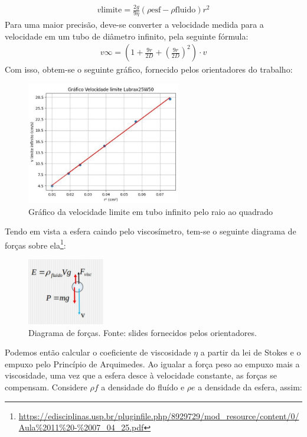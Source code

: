 \begin{align*}
    v\text{limite} =\frac{2g}{9\eta}(\rho \text{esf}- \rho \text{fluido})r^2
\end{align*}
Para uma maior precisão, deve-se converter a velocidade medida para a velocidade em um tubo de diâmetro infinito, pela seguinte fórmula:
\begin{align*}
    v \infty = \left(1 + \frac{9r}{2D} + \left(\frac{9r}{2D}\right)^2\right) \cdot v 
\end{align*}
Com isso, obtem-se o seguinte gráfico, fornecido pelos orientadores do trabalho:
\begin{figure}[H]
    \centering
    \includegraphics[width=0.6\textwidth]{fig/GraficoOrientadores.jpg}
    \caption{Gráfico da velocidade limite em tubo infinito pelo raio ao quadrado}
    \label{fig:grafVisc2}
\end{figure}
Tendo em vista a esfera caindo pelo viscosímetro, tem-se o seguinte diagrama de forças sobre ela\footnote{\url{https://edisciplinas.usp.br/pluginfile.php/8929729/mod_resource/content/0/Aula\%2011\%20-\%2007_04_25.pdf}}:
\begin{figure}[H]
    \centering
    \includegraphics[width=0.3\textwidth]{fig/DiagramaDeForcas.png}
    \caption{Diagrama de forças. Fonte: slides fornecidos pelos orientadores.}
    \label{fig:grafVisc}
\end{figure}
Podemos então calcular o coeficiente de viscosidade \(\eta\) a partir da lei de Stokes e o empuxo pelo Princípio de Arquimedes. Ao igualar a força peso ao empuxo mais a viscosidade, uma vez que a esfera desce à velocidade constante, as forças se compensam. Considere \(\rho f\) a densidade do fluído e \(\rho e\) a densidade da esfera, assim:
